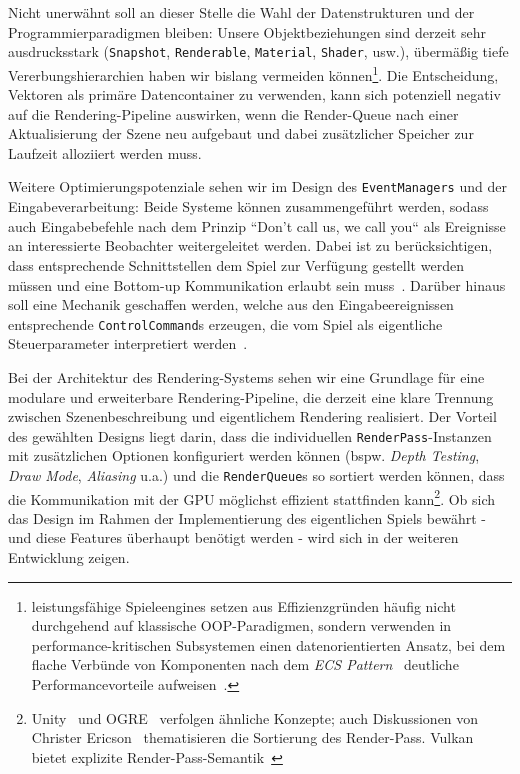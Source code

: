 Nicht unerwähnt soll an dieser Stelle die Wahl der Datenstrukturen und der Programmierparadigmen bleiben: Unsere Objektbeziehungen sind derzeit sehr ausdrucksstark (\texttt{Snapshot}, \texttt{Renderable}, \texttt{Material}, \texttt{Shader}, usw.), übermäßig tiefe Vererbungshierarchien haben wir bislang vermeiden können\footnote{
leistungsfähige Spieleengines setzen aus Effizienzgründen häufig nicht durchgehend auf klassische OOP-Paradigmen, sondern verwenden in performance-kritischen Subsystemen einen datenorientierten Ansatz, bei dem flache Verbünde von Komponenten nach dem \textit{ECS Pattern}~\cite[]{RCCK25} deutliche Performancevorteile aufweisen~\cite[]{WWM22}.
}.
Die Entscheidung, Vektoren als primäre Datencontainer zu verwenden, kann sich potenziell negativ auf die Rendering-Pipeline auswirken, wenn die Render-Queue nach einer Aktualisierung der Szene neu aufgebaut und dabei zusätzlicher Speicher zur Laufzeit alloziiert werden muss.\par

Weitere Optimierungspotenziale sehen wir im Design des \texttt{EventManagers} und der Eingabeverarbeitung: Beide Systeme können zusammengeführt werden, sodass auch Eingabebefehle nach dem Prinzip ``Don't call us, we call you`` als Ereignisse an interessierte Beobachter weitergeleitet werden.
Dabei ist zu berücksichtigen, dass entsprechende Schnittstellen dem Spiel zur Verfügung gestellt werden müssen und eine Bottom-up Kommunikation erlaubt sein muss~\cite[]{BMRS+96}.
Darüber hinaus soll eine Mechanik geschaffen werden, welche aus den Eingabeereignissen entsprechende \texttt{ControlCommand}s erzeugen, die vom Spiel als eigentliche  Steuerparameter interpretiert werden~\cite[21 ff.]{Nys14}.\par

Bei der Architektur des Rendering-Systems sehen wir eine Grundlage für eine modulare und erweiterbare Rendering-Pipeline, die derzeit eine klare Trennung zwischen Szenenbeschreibung und eigentlichem Rendering realisiert.
Der Vorteil des gewählten Designs liegt darin, dass die individuellen \texttt{RenderPass}-Instanzen mit zusätzlichen Optionen konfiguriert werden können (bspw. \textit{Depth Testing}, \textit{Draw Mode}, \textit{Aliasing} u.a.) und die \texttt{RenderQueue}s so sortiert werden können, dass die Kommunikation mit der GPU möglichst effizient stattfinden kann\footnote{
    Unity~\cite[]{UnityRenderQueue} und OGRE~\cite[]{OgreRenderQueue} verfolgen ähnliche Konzepte; auch Diskussionen von Christer Ericson~\cite[]{ChristerEricson} thematisieren die Sortierung des Render-Pass. Vulkan bietet explizite Render-Pass-Semantik~\cite[]{VulkanRenderPass}
}.
Ob sich das Design im Rahmen der Implementierung des eigentlichen Spiels bewährt - und diese Features überhaupt benötigt werden - wird sich in der weiteren Entwicklung zeigen.\par



